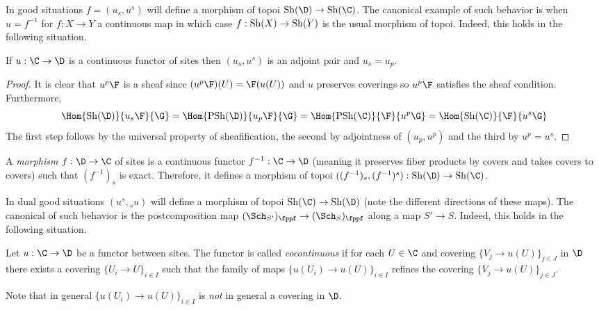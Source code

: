\documentclass[12pt]{article}
\begin{document}
In good situations $f = (u_s, u^s)$ will define a morphism of topoi $\Sh(\D) \to \Sh(\C)$. The canonical example of such behavior is when $u = f^{-1}$ for $f : X \to Y$ a continuous map in which case $f : \mathrm{Sh}(X) \to \mathrm{Sh}(Y)$ is the usual morphism of topoi. Indeed, this holds in the following situation. 

\begin{lemma}
If $u : \C \to \D$ is a continuous functor of sites then $(u_s, u^s)$ is an adjoint pair and $u_s = u_p$.
\end{lemma}

\begin{proof}
It is clear that $u^p \F$ is a sheaf since $(u^p \F)(U) = \F(u(U))$ and $u$ preserves coverings so $u^p \F$ satisfies the sheaf condition. Furthermore,
\[ \Hom{\Sh(\D)}{u_s \F}{\G} = \Hom{\PSh(\D)}{u_p \F}{\G} = \Hom{\PSh(\C)}{\F}{u^p \G} = \Hom{\Sh(\C)}{\F}{u^s \G} \]
The first step follows by the universal property of sheafification, the second by adjointness of $(u_p, u^p)$ and the third by $u^p = u^s$. 
\end{proof}

\begin{defn}
A \textit{morphism} $f : \D \to \C$ of sites is a continuous functor $f^{-1} : \C \to \D$ (meaning it preserves fiber products by covers and takes covers to covers) such that $(f^{-1})_s$ is exact. Therefore, it defines a morphism of topoi $((f^{-1})_s, (f^{-1})^s) : \Sh(\D) \to \Sh(\C)$. 
\end{defn}

In dual good situations $(u^s, {}_s u)$ will define a morphism of topoi $\Sh(\C) \to \Sh(\D)$ (note the different directions of these maps). The canonical of such behavior is the postcomposition map $(\Sch_{S'})_{\fppf} \to (\Sch_{S})_{\fppf}$ along a map $S' \to S$. Indeed, this holds in the following situation.

\begin{defn}
Let $u : \C \to \D$ be a functor between sites. The functor is called \textit{cocontinuous} if for each $U \in \C$ and covering $\{ V_j \to u(U) \}_{j \in J}$ in $\D$ there exists a covering $\{U_i \to U\}_{i \in I}$ such that the family of maps $\{ u(U_i) \to u(U) \}_{i \in I}$ refines the covering $\{ V_j \to u(U) \}_{j \in J}$.
\end{defn}

\begin{rmk}
Note that in general $\{ u(U_i) \to u(U) \}_{i \in I}$ is \textit{not} in general a covering in $\D$. 
\end{rmk}
\end{document}
